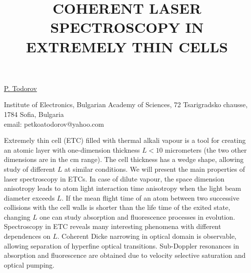 \title{COHERENT LASER SPECTROSCOPY IN EXTREMELY THIN CELLS}

\underline{P. Todorov}


Institute of Electronics,
Bulgarian Academy of Sciences,
72 Tsarigradsko chausse,
1784 Sofia, Bulgaria\\
email: petkoatodorov@yahoo.com

Extremely thin cell (ETC) filled with thermal alkali vapour is a tool for creating an atomic layer with one-dimension thickness $L<10$ micrometers (the two other dimensions are in the cm range). The cell thickness has a wedge shape, allowing study of different $L$ at similar conditions.
We will present the main properties of laser spectroscopy in ETCs.
In case of dilute vapour, the space dimension anisotropy leads to atom light interaction time anisotropy when the light beam diameter exceeds $L$. If the mean flight time of an atom between two successive collisions with the cell walls is shorter than the life time of the exited state, changing $L$ one can study absorption and fluorescence processes in evolution.
Spectroscopy in ETC reveals many interesting phenomena with different dependences on $L$. Coherent Dicke narrowing in optical domain is observable, allowing separation of hyperfine optical transitions. Sub-Doppler resonances in absorption and fluorescence are obtained due to velocity selective saturation and optical pumping.

\vspace{\baselineskip}